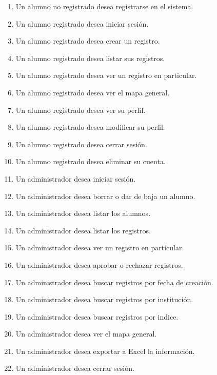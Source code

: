 	\begin{enumerate}[CU1: ]
		\itemsep-1em
		\item Un alumno no registrado desea registrarse en el sistema.
		\item Un alumno registrado desea iniciar sesión.
		\item Un alumno registrado desea crear un registro.
		\item Un alumno registrado desea listar sus registros.
		\item Un alumno registrado desea ver un registro en particular.
		\item Un alumno registrado desea ver el mapa general.
		\item Un alumno registrado desea ver su perfil.
		\item Un alumno registrado desea modificar su perfil.
		\item Un alumno registrado desea cerrar sesión.
		\item Un alumno registrado desea eliminar su cuenta.
		\item Un administrador desea iniciar sesión.
		\item Un administrador desea borrar o dar de baja un alumno.
		\item Un administrador desea listar los alumnos.
		\item Un administrador desea listar los registros.
		\item Un administrador desea ver un registro en particular.
		\item Un administrador desea aprobar o rechazar registros.
		\item Un administrador desea buscar registros por fecha de creación.
		\item Un administrador desea buscar registros por institución.
		\item Un administrador desea buscar registros por indice.
		\item Un administrador desea ver el mapa general.
		\item Un administrador desea exportar a Excel la información.
		\item Un administrador desea cerrar sesión.
	\end{enumerate}


	